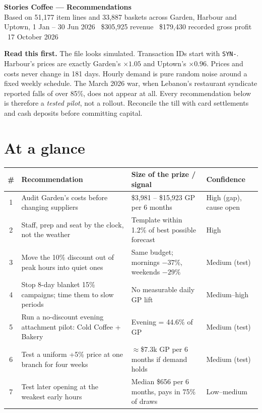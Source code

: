 \documentclass[10pt]{article}
\begin{document}
{\color{brown}\bfseries\LARGE Stories Coffee --- Recommendations}\\[2pt]
{\color{gray}Based on 51,177 item lines and 33,887 baskets across Garden, Harbour and Uptown, 1 Jan -- 30 Jun 2026 \textbullet\ \$305,925 revenue \textbullet\ \$179,430 recorded gross profit \textbullet\ 17 October 2026}

\begin{tcolorbox}[colback=sand,colframe=terra,boxrule=0.6pt,arc=2pt,left=6pt,right=6pt,top=4pt,bottom=4pt]
\textbf{Read this first.} The file looks simulated. Transaction IDs start with \texttt{SYN-}. Harbour's prices are exactly Garden's $\times 1.05$ and Uptown's $\times 0.96$. Prices and costs never change in 181 days. Hourly demand is pure random noise around a fixed weekly schedule. The March 2026 war, when Lebanon's restaurant syndicate reported falls of over 85\%, does not appear at all. Every recommendation below is therefore a \emph{tested pilot}, not a rollout. Reconcile the till with card settlements and cash deposits before committing capital.
\end{tcolorbox}

\section*{At a glance}
\renewcommand{\arraystretch}{1.12}
\begin{tabularx}{\linewidth}{@{}c>{\raggedright\arraybackslash}X>{\raggedright\arraybackslash}p{4.4cm}l@{}}
\toprule
\textbf{\#} & \textbf{Recommendation} & \textbf{Size of the prize / signal} & \textbf{Confidence}\\
\midrule
1 & Audit Garden's costs before changing suppliers & \$3,981 -- \$15,923 GP per 6 months & High (gap), cause open\\
2 & Staff, prep and seat by the clock, not the weather & Template within 1.2\% of best possible forecast & High\\
3 & Move the 10\% discount out of peak hours into quiet ones & Same budget; mornings $-37\%$, weekends $-29\%$ & Medium (test)\\
4 & Stop 8-day blanket 15\% campaigns; time them to slow periods & No measurable daily GP lift & Medium--high\\
5 & Run a no-discount evening attachment pilot: Cold Coffee + Bakery & Evening = 44.6\% of GP & Medium (test)\\
6 & Test a uniform +5\% price at one branch for four weeks & $\approx$\$7.3k GP per 6 months if demand holds & Medium (test)\\
7 & Test later opening at the weakest early hours & Median \$656 per 6 months, pays in 75\% of draws & Low--medium\\
\bottomrule
\end{tabularx}
\end{document}
